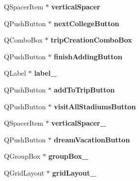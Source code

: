 \begin{DoxyCompactItemize}
Q\+Spacer\+Item $\ast$ {\bfseries vertical\+Spacer}
\item 
\mbox{\label{class_ui___main_window_a98783c8613f3d9744c49b7ce6d7c4165}} 
Q\+Push\+Button $\ast$ {\bfseries next\+College\+Button}
\item 
\mbox{\label{class_ui___main_window_a450c35ad9de95e76da29505333ec9c91}} 
Q\+Combo\+Box $\ast$ {\bfseries trip\+Creation\+Combo\+Box}
\item 
\mbox{\label{class_ui___main_window_a7e2c4661ff5eded869c48791ad84c9ca}} 
Q\+Push\+Button $\ast$ {\bfseries finish\+Adding\+Button}
\item 
\mbox{\label{class_ui___main_window_a0376fd90247280e7c7957cc70628708c}} 
Q\+Label $\ast$ {\bfseries label\+\_}
\item 
\mbox{\label{class_ui___main_window_a415e06ab91298a44aaca7314f523af43}} 
Q\+Push\+Button $\ast$ {\bfseries add\+To\+Trip\+Button}
\item 
\mbox{\label{class_ui___main_window_a4ae8e48c0c97b0b29a30b91aca1be7da}} 
Q\+Push\+Button $\ast$ {\bfseries visit\+All\+Stadiums\+Button}
\item 
\mbox{\label{class_ui___main_window_a298e82ba0cc2500cd61f393f493e4529}} 
Q\+Spacer\+Item $\ast$ {\bfseries vertical\+Spacer\+\_}
\item 
\mbox{\label{class_ui___main_window_ae6d7bd3e8107aa8ce0aa3f1381d20084}} 
Q\+Push\+Button $\ast$ {\bfseries dream\+Vacation\+Button}
\item 
\mbox{\label{class_ui___main_window_a320d3d7ba1cb8fff7b7b95923ed10f5e}} 
Q\+Group\+Box $\ast$ {\bfseries group\+Box\+\_}
\item 
\mbox{\label{class_ui___main_window_a8ee86315639f324b17708efc7dbe8b19}} 
Q\+Grid\+Layout $\ast$ {\bfseries grid\+Layout\+\_}
\item 
\mbox{\label{class_ui___main_window_a3380d4752cf4b1cd8151b8e0a4609639}} 

\end{DoxyCompactItemize}
